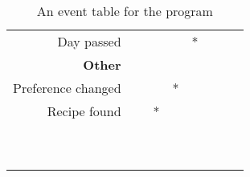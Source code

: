 \begin{table}
\begin{tabular}{|r|c|c|c|c|c|c|}
        Day passed                             & ~       & ~      & ~    & *    & ~ & ~ \\ 
        \textbf{Other}                         & ~       & ~      & ~    & ~    & ~ & ~ \\ 
        Preference changed                     & ~       & ~      & *    & ~    & ~ & ~ \\ 
        Recipe found                           & ~       & *      & ~    & ~    & ~ & ~ \\ 
        ~                                      & ~       & ~      & ~    & ~    & ~ & ~ \\ 
        ~                                      & ~       & ~      & ~    & ~    & ~ & ~ \\
        \hline    
    \end{tabular}
    \caption{An event table for the program} 
    \label{tab:EventTable}
\end{table}